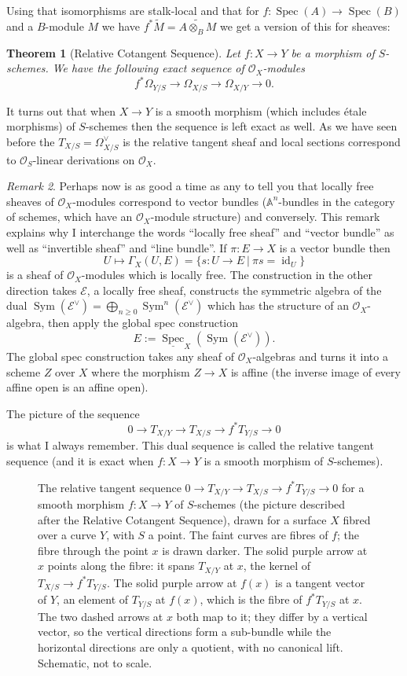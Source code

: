 \documentclass[12pt]{article}
\numberwithin{equation}{section}
\newtheorem{theorem}{Theorem}[subsection]
\theoremstyle{definition}
\theoremstyle{remark}
\newtheorem{remark}[theorem]{Remark}
\newcommand{\id}{\operatorname{id}}
\newcommand{\Ocal}{\mathcal{O}}
\renewcommand{\AA}{\mathbb{A}}
\newcommand{\Spec}{\operatorname{Spec}}
\newcommand{\Sym}{\operatorname{Sym}}
\begin{document}
Using that isomorphisms are stalk-local and that for $f: \Spec(A)\to \Spec(B)$ and a $B$-module $M$ we have $f^* \widetilde{M} =\widetilde{A \otimes_B M}$ we get a version of this for sheaves:
\begin{theorem}[Relative Cotangent Sequence]
	Let $f:X\to Y$ be a morphism of $S$-schemes. 
	We have the following exact sequence of $\Ocal_X$-modules 
	 $$ f^*\Omega_{Y/S} \to \Omega_{X/S} \to \Omega_{X/Y} \to 0. $$
\end{theorem}
It turns out that when $X\to Y$ is a smooth morphism (which includes \'etale morphisms) of $S$-schemes then the sequence is left exact as well. 
As we have seen before the $T_{X/S} = \Omega_{X/S}^{\vee}$ is the relative tangent sheaf and local sections correspond to $\Ocal_S$-linear derivations on $\Ocal_X$.
\begin{remark}
Perhaps now is as good a time as any to tell you that locally free sheaves of $\Ocal_X$-modules correspond to vector bundles ($\AA^n$-bundles in the category of schemes, which have an $\Ocal_X$-module structure) and conversely. 
This remark explains why I interchange the words ``locally free sheaf'' and ``vector bundle'' as well as ``invertible sheaf'' and ``line bundle''.
If $\pi: E\to X$ is a vector bundle then 
 $$ U \mapsto \Gamma_X(U,E) = \lbrace s: U \to E \ \vert \ \pi s = \id_U \rbrace $$
is a sheaf of $\Ocal_X$-modules which is locally free.
The construction in the other direction takes $\mathcal{E}$, a locally free sheaf, constructs the symmetric algebra of the dual $\Sym(\mathcal{E}^{\vee}) = \bigoplus_{n \geq 0} \Sym^n(\mathcal{E}^{\vee})$ which has the structure of an $\Ocal_X$-algebra, then apply the global spec construction 
 $$ E := \underline{\Spec}_X( \Sym(\mathcal{E}^{\vee})).$$
The global spec construction takes any sheaf of $\Ocal_X$-algebras and turns it into a scheme $Z$ over $X$ where the morphism $Z\to X$ is affine (the inverse image of every affine open is an affine open). 
\end{remark} 
The picture of the sequence 
 $$ 0 \to T_{X/Y} \to T_{X/S} \to f^*T_{Y/S} \to 0 $$
is what I always remember. 
This dual sequence is called the relative tangent sequence (and it is exact when $f:X\to Y$ is a smooth morphism of $S$-schemes).
\begin{figure}[H]
\centering

\caption{The relative tangent sequence $0\to T_{X/Y}\to T_{X/S}\to f^*T_{Y/S}\to0$ for a smooth morphism $f\colon X\to Y$ of $S$-schemes (the picture described after the Relative Cotangent Sequence), drawn for a surface $X$ fibred over a curve $Y$, with $S$ a point. The faint curves are fibres of $f$; the fibre through the point $x$ is drawn darker. The solid purple arrow at $x$ points along the fibre: it spans $T_{X/Y}$ at $x$, the kernel of $T_{X/S}\to f^*T_{Y/S}$. The solid purple arrow at $f(x)$ is a tangent vector of $Y$, an element of $T_{Y/S}$ at $f(x)$, which is the fibre of $f^*T_{Y/S}$ at $x$. The two dashed arrows at $x$ both map to it; they differ by a vertical vector, so the vertical directions form a sub-bundle while the horizontal directions are only a quotient, with no canonical lift. Schematic, not to scale.}\label{fig:relative-tangent}
\end{figure}
\end{document}
